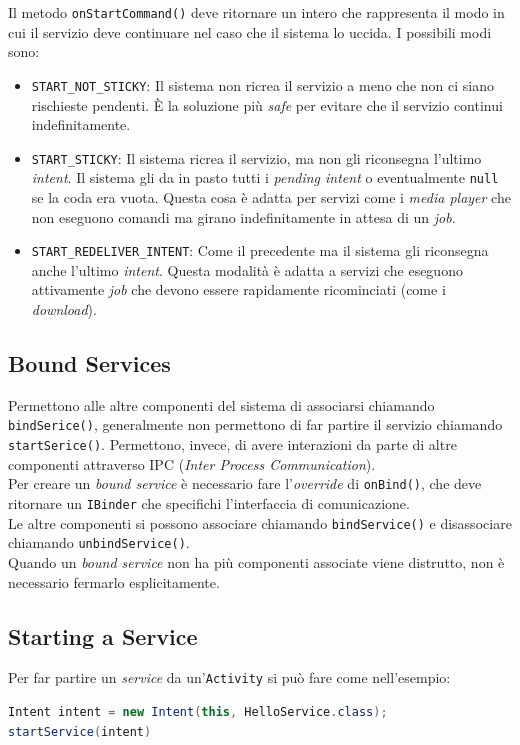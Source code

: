 \documentclass{book}
\begin{document}
Il metodo \texttt{onStartCommand()} deve ritornare un intero che rappresenta il modo in cui il servizio deve continuare nel caso che il sistema lo uccida. I possibili modi sono:

\begin{itemize}
	\item \texttt{START\_NOT\_STICKY}: Il sistema non ricrea il servizio a meno che non ci siano rischieste pendenti. È la soluzione più \textit{safe} per evitare che il servizio continui indefinitamente.
	\item \texttt{START\_STICKY}: Il sistema ricrea il servizio, ma non gli riconsegna l'ultimo \textit{intent}. Il sistema gli da in pasto tutti i \textit{pending intent} o eventualmente \texttt{null} se la coda era vuota.
	Questa cosa è adatta per servizi come i \textit{media player} che non eseguono comandi ma girano indefinitamente in attesa di un \textit{job}.
	\item \texttt{START\_REDELIVER\_INTENT}: Come il precedente ma il sistema gli riconsegna anche l'ultimo \textit{intent}. Questa modalità è adatta a servizi che eseguono attivamente \textit{job} che devono essere rapidamente ricominciati (come i \textit{download}).
\end{itemize}

\subsection{Bound Services}
Permettono alle altre componenti del sistema di associarsi chiamando \texttt{bindSerice()}, generalmente non permettono di far partire il servizio chiamando \texttt{startSerice()}. Permettono, invece, di avere interazioni da parte di altre componenti attraverso IPC (\textit{Inter Process Communication}).\\
Per creare un \textit{bound service} è necessario fare l'\textit{override} di \texttt{onBind()}, che deve ritornare un \texttt{IBinder} che specifichi l'interfaccia di comunicazione.\\
Le altre componenti si possono associare chiamando \texttt{bindService()} e disassociare chiamando \texttt{unbindService()}.\\
Quando un \textit{bound service} non ha più componenti associate viene distrutto, non è necessario fermarlo esplicitamente.


\subsection{Starting a Service}
Per far partire un \textit{service} da un'\texttt{Activity} si può fare come nell'esempio:
\begin{lstlisting}[language=Java]
Intent intent = new Intent(this, HelloService.class);
startService(intent)
\end{lstlisting}
\end{document}
